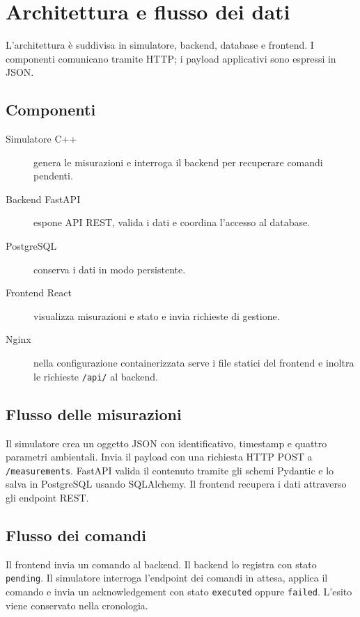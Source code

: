 \chapter{Architettura e flusso dei dati}

L'architettura è suddivisa in simulatore, backend, database e frontend. I componenti comunicano tramite HTTP; i payload applicativi sono espressi in JSON.

\section{Componenti}
\begin{description}
    \item[Simulatore C++] genera le misurazioni e interroga il backend per recuperare comandi pendenti.
    \item[Backend FastAPI] espone API REST, valida i dati e coordina l'accesso al database.
    \item[PostgreSQL] conserva i dati in modo persistente.
    \item[Frontend React] visualizza misurazioni e stato e invia richieste di gestione.
    \item[Nginx] nella configurazione containerizzata serve i file statici del frontend e inoltra le richieste \texttt{/api/} al backend.
\end{description}

\section{Flusso delle misurazioni}
Il simulatore crea un oggetto JSON con identificativo, timestamp e quattro parametri ambientali. Invia il payload con una richiesta HTTP POST a \texttt{/measurements}. FastAPI valida il contenuto tramite gli schemi Pydantic e lo salva in PostgreSQL usando SQLAlchemy. Il frontend recupera i dati attraverso gli endpoint REST.

\section{Flusso dei comandi}
Il frontend invia un comando al backend. Il backend lo registra con stato \texttt{pending}. Il simulatore interroga l'endpoint dei comandi in attesa, applica il comando e invia un acknowledgement con stato \texttt{executed} oppure \texttt{failed}. L'esito viene conservato nella cronologia.
